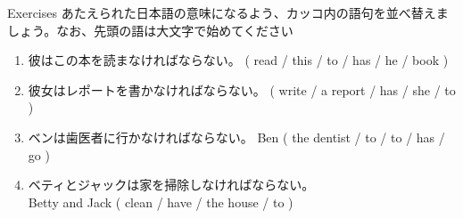 \documentclass[aspectratio=169,xcolor={dvipsnames,table}]{beamer}
\newcommand{\myaudio}[1]{\href{#1}{\faVolumeUp}}
\begin{document}
\begin{frame}[plain]{Exercises}
あたえられた日本語の意味になるよう、カッコ内の語句を並べ替えましょう。なお、先頭の語は大文字で始めてください%
\hfill{\scriptsize \myaudio{./audio/014_have_to_04.mp3}}
 \begin{enumerate}
  \item {\small 彼はこの本を読まなければならない。}
( read / this / to / has / he / book )\\
  \item {\small 彼女はレポートを書かなければならない。}
( write / a report / has / she / to )\\
  \item {\small ベンは歯医者に行かなければならない。}
Ben ( the dentist / to / to / has / go )\\
\item {\small ベティとジャックは家を掃除しなければならない。}\\
Betty and Jack  ( clean /  have / the house / to )\\
 \end{enumerate}
\end{frame}
\end{document}
